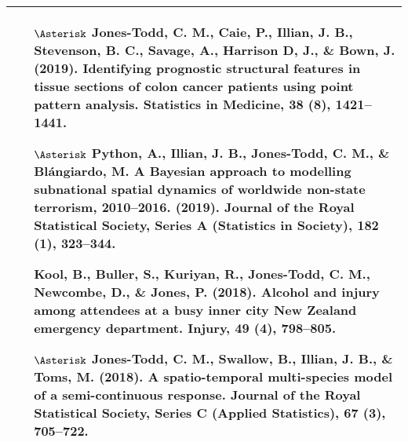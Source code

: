\documentclass[12pt, a4paper]{article}
\begin{document}
\begin{center}
\begin{longtable}{|p{16.3 cm}|}
\begin{itemize}
\item[$\Asterisk$] {\bf Jones-Todd, C. M.}, Caie, P., Illian, J. B., Stevenson, B. C., Savage, A., Harrison D, J., \& Bown, J. {\bf (2019).} Identifying prognostic structural features in tissue sections of colon cancer patients using point pattern analysis.
  Statistics in Medicine, 38 (8), 1421--1441.
\item[$\Asterisk$] Python, A., Illian, J. B., {\bf Jones-Todd, C. M.}, \& Bl\'angiardo, M. A Bayesian approach to modelling subnational
  spatial dynamics of worldwide non-state terrorism, 2010–2016. {\bf (2019).} Journal of the Royal Statistical Society,
  Series A (Statistics in Society), 182 (1), 323--344.
\item[] Kool, B., Buller, S., Kuriyan, R., {\bf Jones-Todd, C. M.}, Newcombe, D., \& Jones, P. {\bf (2018).} Alcohol and injury among
  attendees at a busy inner city New Zealand emergency department. Injury, 49 (4), 798--805.
\item[$\Asterisk$] {\bf Jones-Todd, C. M.}, Swallow, B., Illian, J. B., \& Toms, M. {\bf (2018).} A spatio-temporal multi-species model of a
  semi-continuous response. Journal of the Royal Statistical Society, Series C (Applied Statistics), 67 (3), 705--722.
\end{itemize} \\

\hline 

\hline 


\end{longtable}
\end{center}
\end{document}
